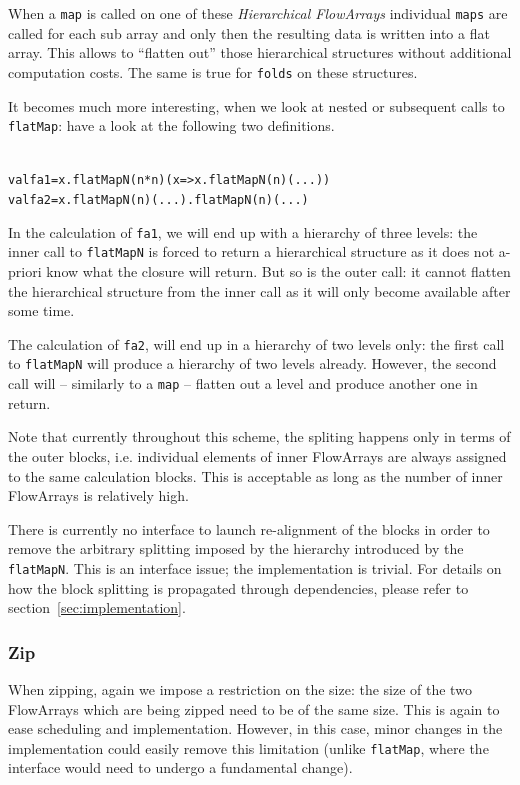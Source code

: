 \documentclass[runningheads,a4paper,fleqn]{llncs}
\begin{document}
When a \texttt{map} is called on one of these \emph{Hierarchical
  FlowArrays} individual \texttt{maps} are called for each sub array
and only then the resulting data is written into a flat array. This
allows to ``flatten out'' those hierarchical structures without
additional computation costs. The same is true for \texttt{folds} on
these structures.

It becomes much more interesting, when we look at nested or subsequent
calls to \texttt{flatMap}: have a look at the following two
definitions.
\begin{alltt}
{\scriptsize
val fa1 = x.flatMapN(n*n)(x => x.flatMapN(n)( ... ))
val fa2 = x.flatMapN(n)(...).flatMapN(n)(...)
}
\end{alltt}
In the calculation of \texttt{fa1}, we will end up with a hierarchy of
three levels: the inner call to \texttt{flatMapN} is forced to return
a hierarchical structure as it does not a-priori know what the closure
will return. But so is the outer call: it cannot flatten the hierarchical
structure from the inner call as it will only become available after
some time.

The calculation of \texttt{fa2}, will end up in a hierarchy of
two levels only: the first call to \texttt{flatMapN} will produce a 
hierarchy of two levels already. However, the second call will --
similarly to a \texttt{map} -- flatten out a level and produce another
one in return.

Note that currently throughout this scheme, the spliting happens only
in terms of the outer 
blocks, i.e. individual elements of inner FlowArrays are always
assigned to the same calculation blocks. This is acceptable as long as
the number of inner FlowArrays is relatively high.

There is currently no interface to launch re-alignment of the blocks
in order to remove the arbitrary splitting imposed by the hierarchy
introduced by the \texttt{flatMapN}. This is an interface issue; the
implementation is trivial. For details on how the block splitting is
propagated through dependencies, please refer to
section~\ref{sec:implementation}.

\subsubsection{Zip}
When zipping, again we impose a restriction on the size: the size of
the two FlowArrays which are being zipped need to be of the same
size. This is again to ease scheduling and implementation. However, in
this case, minor changes in the implementation could easily remove
this limitation (unlike \texttt{flatMap}, where the interface would
need to undergo a fundamental change).
\end{document}
